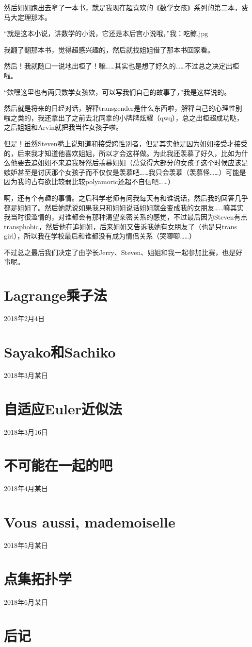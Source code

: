 \documentclass{article}
\begin{document}
然后姐姐跑出去拿了一本书，就是我现在超喜欢的《数学女孩》系列的第二本，费马大定理那本。

“就是这本小说，讲数学的小说，它还是本后宫小说哦，”我：吃鲸.jpg

我翻了翻那本书，觉得超感兴趣的，然后就找姐姐借了那本书回家看。

然后！我就随口一说地出柜了！嘛……其实也是想了好久的……不过总之决定出柜啦。

“欸嘿这里也有两只数学女孩欸，可以写我们自己的故事了，”我是这样说的。

然后就是将来的日经对话，解释transgender是什么东西啦，解释自己的心理性别啦之类的，我还拿出了之前去北同拿的小牌牌炫耀（qwq），总之出柜超成功哒，之后姐姐和Arvin就把我当作女孩子啦。

但是！虽然Steven嘴上说知道和接受跨性别者，但是其实他是因为姐姐接受才接受的，后来我才知道他喜欢姐姐，所以才会这样做。为此我还羡慕了好久，比如为什么他要去追姐姐不来追我呀然后羡慕姐姐（总觉得大部分的女孩子这个时候应该是嫉妒甚至是讨厌那个女孩子而不仅仅是羡慕吧……我只会羡慕（羡慕怪……）可能是因为我的占有欲比较弱比较polyamoric还超不自信吧……）

啊，还有个有趣的事情。之后科学老师有问我每天有和谁说话，然后我的回答几乎都是姐姐了。然后她就说如果我只和姐姐说话姐姐就会变成我的女朋友……嘛其实我当时很滥情的，对谁都会有那种渴望亲密关系的感觉，不过最后因为Steven有点transphobic，然后他在追姐姐，后来姐姐又告诉我她有女朋友了（也是只trans girl），所以我在学校最后和谁都没有成为情侣关系（哭唧唧……）

不过总之最后我们决定了由学长Jerry、Steven、姐姐和我一起参加比赛，也是好事呢。

\section{Lagrange乘子法}
2018年2月4日

\section{Sayako和Sachiko}
2018年3月某日

\section{自适应Euler近似法}
2018年3月16日

\section{不可能在一起的吧}
2018年4月某日

\section{Vous aussi, mademoiselle}
2018年5月某日

\section{点集拓扑学}
2018年6月某日

\section{后记}
\end{document}

